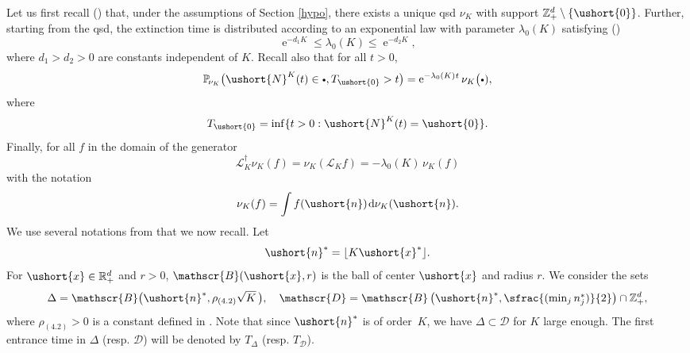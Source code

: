 \documentclass[10pt]{amsart}
\newcommand{\psfrac}[2]{\sfrac{(#1)}{#2}}
\newcommand{\sbullet}{{\scriptscriptstyle\bullet}}
\newcommand{\csbullet}{{\raisebox{1pt}{$\sbullet$}}}
\let\backslash\setminus
\let\ts\textstyle
\let\mathcal\mathscr
\numberwithin{equation}{section}
\theoremstyle{plain}
\theoremstyle{definition}
\newcommand{\proba}{{\mathbb{P}}}
\newcommand{\zentiers}{{\mathbb{Z}}}
\newcommand{\domaine}{\zentiers_{+}^{d}}
\newcommand{\rpd}{\mathbb{R}_+^d}
\newcommand{\sK}{K}
\newcommand{\gen}{\mathscr{L}_{\sK}}
\newcommand{\vecn}{\ushort{n}}
\newcommand{\vecnf}{\ushort{n}^*}
\newcommand{\vecxf}{\ushort{x}^*}
\newcommand{\vecx}{\ushort{x}}
\newcommand{\veczer}{\ushort{0}}
\newcommand{\sDelta}{\Delta}
\newcommand{\leproc}{\ushort{N}^{K}}
\newcommand{\nuk}{\nu_{K}}\let\snuk\nuk
\newcommand{\e}{\operatorname{e}}
\newcommand{\dd}{\hspace{1pt}\mathrm{d}}
\begin{document}
Let us first recall (\cf \cite{ccm2}) that, under the assumptions of Section \ref{hypo}, there exists a unique qsd $
\nuk$ with support $\domaine\backslash \{\veczer\}$.
Further, starting from the qsd, the extinction time is distributed according to an exponential law with parameter
$\lambda_{0}(K)$ satisfying (\cite[Th.\,3.2]{ccm2})
\begin{equation}
\label{eq:lambda0}
\e^{-d_{1} K}\le\lambda_{0}(K)\le \e^{-d_{2} K},
\end{equation}
where $d_{1}>d_{2}>0$ are constants independent of $K$.
Recall also that for all $t>0$,
\begin{equation}
\label{pte-qsd}
\proba_{\!\nuk}\bigl(\leproc(t)\in \csbullet,T_{\veczer}>t\bigr)=
\e^{-\lambda_{0}(K)\hspace{.4pt}t}\nuk\bigl(\csbullet),
\end{equation}
where
\[
T_{\veczer}=\inf\{t>0: \leproc(t)=\veczer\}.
\]
Finally, for all $f$ in the domain of the generator
\begin{equation}
\label{eq:miracle}
\gen^{\dagger}\nuk(f)=\nuk(\gen f)= - \lambda_{0}(K)\,\nuk(f)
\end{equation}
with the notation
\[
\nuk(f)=\int f(\vecn) \dd\nuk(\vecn).
\]
We use several notations from \cite{ccm2} that we now recall. Let
\[
\vecnf= \lfloor K \vecxf\rfloor.
\]
For $\vecx\in\rpd$ and $r>0$, $\mathcal{B}(\vecx,r)$ is the ball of center $\vecx$ and radius $r$.
We consider the sets
\begin{equation}
\label{boule}
\Delta = \mathcal{B}\bigl(\vecn^*,\rho_{(4.2)}\sqrt{K}\,\bigr), \quad\mathcal{D} = \mathcal{B} \left(\vecnf,\psfrac{\ts\min_{j} n_{j}^*}{2}\right)\cap \domaine,
\end{equation}
where $\rho_{(4.2)}>0$ is a constant defined in \cite[Cor.\,4.2]{ccm2}.
Note that since $\vecnf$ is of order~$K$, we have
$\Delta \subset \mathcal{D}$ for $K$ large enough. The first entrance time in $\Delta$ (resp. $
\mathcal{D}$) will be denoted by $T_{\!\sDelta}$ (resp. $T_\mathcal{D}$).
\end{document}
